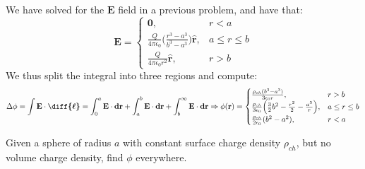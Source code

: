 \documentclass[crop=false,class=book,oneside]{standalone}
\begin{document}
                We have solved for the $\mathbf{E}$ field in
                a previous problem, and have that:
                \begin{equation*}
                    \mathbf{E}
                    =
                    \begin{cases}
                        \mathbf{0},
                        &r<a\\
                        \frac{Q}{4\pi \epsilon_0}
                        \Big(\frac{r^3-a^3}{b^3-a^3}\Big)
                        \hat{\mathbf{r}},
                        &a\leq{r}\leq{b}\\
                        \frac{Q}{4\pi\epsilon_{0}r^{2}}
                        \hat{\mathbf{r}},
                        &r>b
                    \end{cases}    
                \end{equation*}
                We thus split the integral
                into three regions and compute:
                \begin{equation*}
                    \Delta\phi
                    =\int\mathbf{E}\cdot\boldsymbol{\diff{\ell}}
                    =\int_{0}^{a}\mathbf{E}\cdot\mathbf{dr}
                    +\int_{a}^{b}\mathbf{E}\cdot\mathbf{dr}
                    +\int_{b}^{\infty}\mathbf{E}\cdot \mathbf{dr}    
                    \Rightarrow\phi(\mathbf{r})
                    =
                    \begin{cases}
                        \frac{\rho_{ch}(b^{3}-a^{3})}
                             {3\epsilon_{0}r},
                        &r>b\\
                        \frac{\rho_{ch}}{3\epsilon_{0}}\Big(
                            \frac{3}{2}b^{2}
                            -\frac{r^2}{2}
                            -\frac{a^3}{r}
                        \Big),&a\leq{r}\leq{b}\\
                        \frac{\rho_{ch}}{2\epsilon_0}(b^2-a^2),
                        &r<a
                    \end{cases}
                \end{equation*}
            \begin{problem}[Wangsness 5-14]
                Given a sphere of radius $a$ with constant
                surface charge density $\rho_{ch}$, but no
                volume charge density, find $\phi$ everywhere.
            \end{problem}
\end{document}
